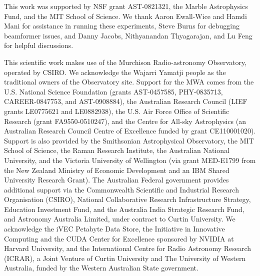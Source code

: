 This work was supported by NSF grant AST-0821321, the Marble Astrophysics Fund, and the MIT School of Science. We thank Aaron Ewall-Wice and Hamdi Mani for assistance in running these experiments, Steve Burns for debugging beamformer issues, and Danny Jacobs, Nithyanandan Thyagarajan, and Lu Feng for helpful discussions. 

This scientific work makes use of the Murchison Radio-astronomy Observatory, operated by CSIRO. We acknowledge the Wajarri Yamatji people as the traditional owners of the Observatory site. Support for the MWA comes from the U.S. National Science Foundation (grants AST-0457585, PHY-0835713, CAREER-0847753, and AST-0908884), the Australian Research Council (LIEF grants LE0775621 and LE0882938), the U.S. Air Force Office of Scientific Research (grant FA9550-0510247), and the Centre for All-sky Astrophysics (an Australian Research Council Centre of Excellence funded by grant CE110001020). Support is also provided by the Smithsonian Astrophysical Observatory, the MIT School of Science, the Raman Research Institute, the Australian National University, and the Victoria University of Wellington (via grant MED-E1799 from the New Zealand Ministry of Economic Development and an IBM Shared University Research Grant). The Australian Federal government provides additional support via the Commonwealth Scientific and Industrial Research Organisation (CSIRO), National Collaborative Research Infrastructure Strategy, Education Investment Fund, and the Australia India Strategic Research Fund, and Astronomy Australia Limited, under contract to Curtin University. We acknowledge the iVEC Petabyte Data Store, the Initiative in Innovative Computing and the CUDA Center for Excellence sponsored by NVIDIA at Harvard University, and the International Centre for Radio Astronomy Research (ICRAR), a Joint Venture of Curtin University and The University of Western Australia, funded by the Western Australian State government.




